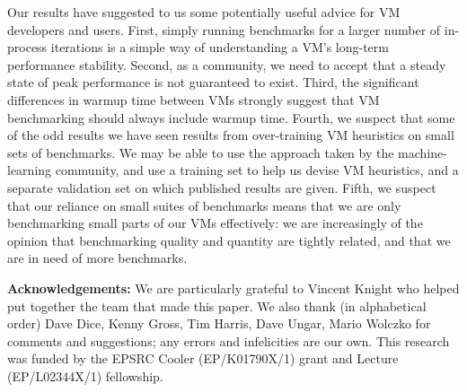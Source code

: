 \documentclass[preprint,numbers,10pt]{sigplanconf}
\begin{document}
Our results have suggested to us some potentially useful advice for VM
developers and users. First, simply running benchmarks for a larger number of
in-process iterations is a simple way of understanding a VM's long-term
performance stability. Second, as a community, we need to accept that a steady
state of peak performance is not guaranteed to exist. Third, the significant
differences in warmup time between VMs strongly suggest that VM benchmarking
should always include warmup time. Fourth, we suspect that some of the odd
results we have seen results from over-training VM heuristics on small sets of
benchmarks. We may be able to use the approach taken by the machine-learning
community, and use a training set to help us devise VM heuristics, and a
separate validation set on which published results are given. Fifth, we suspect
that our reliance on small suites of benchmarks means that we are only
benchmarking small parts of our VMs effectively: we are increasingly of the
opinion that benchmarking quality and quantity are tightly related, and that we
are in need of more benchmarks.

\textbf{Acknowledgements:} We are particularly grateful to Vincent Knight
who helped put together the team that made this paper. We also thank (in alphabetical order) Dave Dice, Kenny
Gross, Tim Harris, Dave Ungar, Mario Wolczko for comments and suggestions; any
errors and infelicities are our own. This research was funded by the EPSRC
Cooler (EP/K01790X/1) grant and Lecture (EP/L02344X/1) fellowship.



\end{document}
